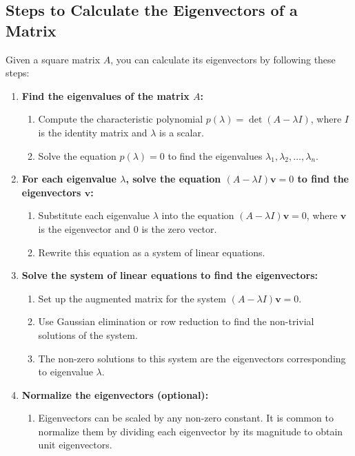 \subsection{Steps to Calculate the Eigenvectors of a Matrix}
\begin{process}
    Given a square matrix \( A \), you can calculate its eigenvectors by following these steps:

    \begin{enumerate}
        \item \textbf{Find the eigenvalues of the matrix \( A \):}
        \begin{enumerate}
            \item Compute the characteristic polynomial \( p(\lambda) = \det(A - \lambda I) \), where \( I \) is the identity matrix and \( \lambda \) is a scalar.
            \item Solve the equation \( p(\lambda) = 0 \) to find the eigenvalues \( \lambda_1, \lambda_2, \dots, \lambda_n \).
        \end{enumerate}
    
        \item \textbf{For each eigenvalue \( \lambda \), solve the equation \( (A - \lambda I) \mathbf{v} = 0 \) to find the eigenvectors \( \mathbf{v} \):}
        \begin{enumerate}
            \item Substitute each eigenvalue \( \lambda \) into the equation \( (A - \lambda I) \mathbf{v} = 0 \), where \( \mathbf{v} \) is the eigenvector and \( 0 \) is the zero vector.
            \item Rewrite this equation as a system of linear equations.
        \end{enumerate}
    
        \item \textbf{Solve the system of linear equations to find the eigenvectors:}
        \begin{enumerate}
            \item Set up the augmented matrix for the system \( (A - \lambda I) \mathbf{v} = 0 \).
            \item Use Gaussian elimination or row reduction to find the non-trivial solutions of the system.
            \item The non-zero solutions to this system are the eigenvectors corresponding to eigenvalue \( \lambda \).
        \end{enumerate}
        
        \item \textbf{Normalize the eigenvectors (optional):}
        \begin{enumerate}
            \item Eigenvectors can be scaled by any non-zero constant. It is common to normalize them by dividing each eigenvector by its magnitude to obtain unit eigenvectors.
        \end{enumerate}
    
    \end{enumerate}
\end{process}

